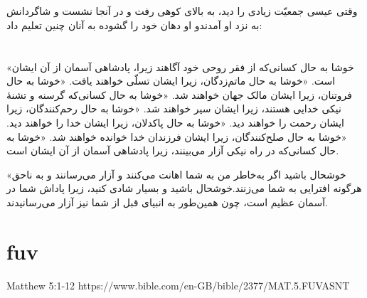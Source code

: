 \documentclass[12pt,fleqn,titlepage,twoside,a4paper]{book}
\begin{document}
\begin{arab}[utf]
\section*{}


وقتی عیسی جمعیّت زیادی را دید، به بالای كوهی رفت و در آنجا نشست و شاگردانش به نزد او آمدندو او دهان خود را گشوده به آنان چنین تعلیم داد:

\section*{}

«خوشا به حال کسانی‌که از فقر روحی خود آگاهند
زیرا، پادشاهی آسمان از آن ایشان است.
«خوشا به حال ماتم‌زدگان،
زیرا ایشان تسلّی خواهند یافت.
«خوشا به حال فروتنان،
زیرا ایشان مالک جهان خواهند شد.
«خوشا به حال کسانی‌که گرسنه و تشنهٔ نیكی خدایی هستند،
زیرا ایشان سیر خواهند شد.
«خوشا به حال رحم‌كنندگان،
زیرا ایشان رحمت را خواهند دید.
«خوشا به حال پاکدلان،
زیرا ایشان خدا را خواهند دید.
«خوشا به حال صلح‌كنندگان،
زیرا ایشان فرزندان خدا خوانده خواهند شد.
«خوشا به حال کسانی‌که در راه نیكی آزار می‌بینند،
زیرا پادشاهی آسمان از آن ایشان است.

«خوشحال باشید اگر به‌خاطر من به شما اهانت می‌کنند و آزار می‌رسانند و به ناحق هرگونه افترایی به شما می‌زنند.خوشحال باشید و بسیار شادی كنید، زیرا پاداش شما در آسمان عظیم است، چون همین‌طور به انبیای قبل از شما نیز آزار می‌رسانیدند.
\end{arab}

\section{fuv}

Matthew 5:1-12 https://www.bible.com/en-GB/bible/2377/MAT.5.FUVASNT
\end{document}
